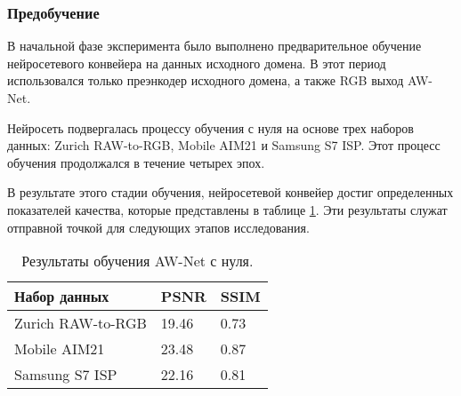 \subsubsection{Предобучение}

В начальной фазе эксперимента было выполнено предварительное обучение нейросетевого конвейера на данных исходного домена. В этот период использовался только преэнкодер исходного домена, а также RGB выход AW-Net.

Нейросеть подвергалась процессу обучения с нуля на основе трех наборов данных: Zurich RAW-to-RGB, Mobile AIM21 и Samsung S7 ISP. Этот процесс обучения продолжался в течение четырех эпох.

В результате этого стадии обучения, нейросетевой конвейер достиг определенных показателей качества, которые представлены в таблице \ref{tab:from-zoro}. Эти результаты служат отправной точкой для следующих этапов исследования.

\begin{table}[H]
    \caption{Результаты обучения AW-Net с нуля.}\label{tab:from-zoro}
    \begin{tabular}{|p{5cm}|p{3cm}|p{3cm}|}
        \hline
        {Набор данных} & {PSNR} & {SSIM} \\
        \hline
        Zurich RAW-to-RGB & 19.46 & 0.73 \\
        \hline
        Mobile AIM21 & 23.48 & 0.87 \\
        \hline
        Samsung S7 ISP & 22.16 & 0.81 \\
        \hline
    \end{tabular}
\end{table}